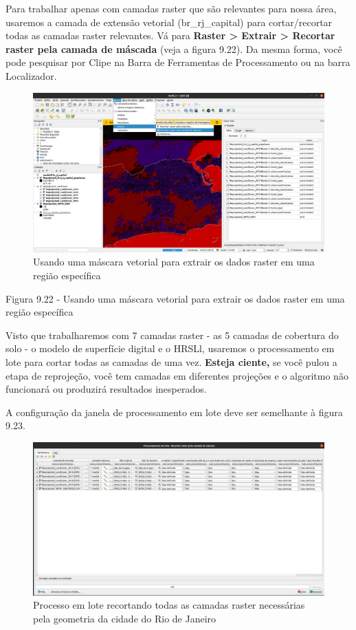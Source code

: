 \documentclass[
  portuguese,
]{krantz}
\begin{document}
Para trabalhar apenas com camadas raster que são relevantes para nossa área, usaremos a camada de extensão vetorial (br\_rj\_capital) para cortar/recortar todas as camadas raster relevantes. Vá para \textbf{Raster \textgreater{} Extrair \textgreater{} Recortar raster pela camada de máscada} (veja a figura 9.22). Da mesma forma, você pode pesquisar por Clipe na Barra de Ferramentas de Processamento ou na barra Localizador.

\begin{figure}
\centering
\includegraphics{media/modulo9/fig922.png}
\caption{Usando uma máscara vetorial para extrair os dados raster em uma região específica}
\end{figure}

Figura 9.22 - Usando uma máscara vetorial para extrair os dados raster em uma região específica

Visto que trabalharemos com 7 camadas raster - as 5 camadas de cobertura do solo - o modelo de superfície digital e o HRSLl, usaremos o processamento em lote para cortar todas as camadas de uma vez. \textbf{Esteja ciente,} se você pulou a etapa de reprojeção, você tem camadas em diferentes projeções e o algoritmo não funcionará ou produzirá resultados inesperados.

A configuração da janela de processamento em lote deve ser semelhante à figura 9.23.

\begin{figure}
\centering
\includegraphics{media/modulo9/fig923.png}
\caption{Processo em lote recortando todas as camadas raster necessárias pela geometria da cidade do Rio de Janeiro}
\end{figure}
\end{document}
